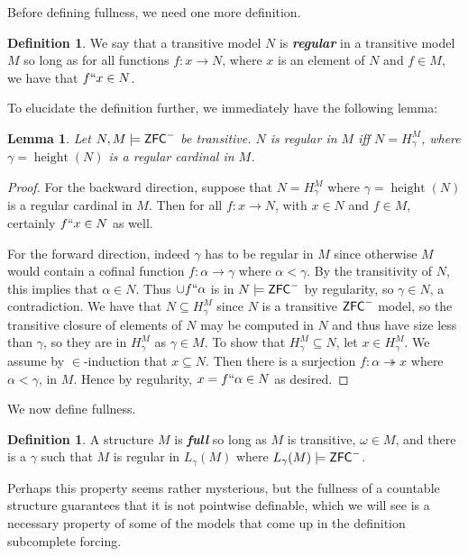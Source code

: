 \documentclass{amsart}
\newtheorem{lemma}[theorem]{Lemma}
\theoremstyle{definition}
\newtheorem{definition}[theorem]{Definition}
\theoremstyle{remark}
\newcommand{\ZFC}{\textup{\ensuremath{\textsf{ZFC}}}}
\DeclareMathOperator{\height}{height}
\newcommand{\To}{\longrightarrow}
\begin{document}
Before defining fullness, we need one more definition.

\begin{definition} We say that a transitive model $N$ is \emph{\textbf{regular}} in a transitive model $M$ so long as for all functions $f: x \To N$, where $x$ is an element of $N$ and $f \in M$, we have that $f``x \in N$. \end{definition}
To elucidate the definition further, we immediately have the following lemma:

\begin{lemma} \label{lemma:regularityequiv}
Let $N, M \models \ZFC^-$ be transitive. $N$ is regular in $M$ iff $N = H_\gamma^M$, where $\gamma = \height(N)$ is a regular cardinal in $M$. %
\end{lemma}
\begin{proof}
For the backward direction, suppose that $N=H_\gamma^M$ where $\gamma = \height(N)$ is a regular cardinal in $M$. Then for all $f: x \longrightarrow N$, with $x \in N$ and $f \in M$, certainly $f``x \in N$ as well.

For the forward direction, indeed $\gamma$ has to be regular in $M$ since otherwise $M$ would contain a cofinal function $f: \alpha \longrightarrow \gamma$ where $\alpha < \gamma$. By the transitivity of $N$, this implies that $\alpha \in N$. Thus $\cup f``\alpha$ is in $N \models \ZFC^-$ by regularity, so $\gamma \in N$, a contradiction.
We have that $N \subseteq H_{\gamma}^M$ since $N$ is a transitive $\ZFC^-$ model, so the transitive closure of elements of $N$ may be computed in $N$ and thus have size less than $\gamma$, so they are in $H_\gamma^M$ as $\gamma \in M$. To show that $H_{\gamma}^M \subseteq N$, let $x \in H_{\gamma}^M$. We assume by $\in$-induction that $x \subseteq N$. Then there is a surjection $f: \alpha \twoheadrightarrow x$ where $\alpha < \gamma$, in $M$. Hence by regularity, $x = f``\alpha \in N$ as desired.
\end{proof}

We now define fullness.

\begin{definition} A structure $M$ is \emph{\textbf{full}} so long as $M$ is transitive, $\omega \in M$, and there is a $\gamma$ such that $M$ is regular in $L_\gamma(M)$ where $L_\gamma(M) \models \ZFC^-$.
\end{definition}

Perhaps this property seems rather mysterious, but the fullness of a countable structure guarantees that it is not pointwise definable, which we will see is a necessary property of some of the models that come up in the definition subcomplete forcing.
\end{document}
